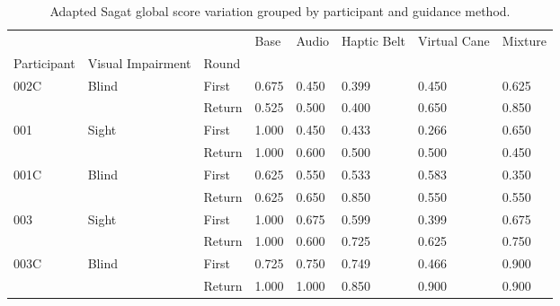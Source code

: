 
\begin{table}[!htb]
\centering
\caption{Adapted Sagat global score variation grouped by participant and guidance method.}
\label{tab:sagat}
\begin{tabular}{llllllll}
\toprule
     &       &        &  Base & Audio & Haptic Belt & Virtual Cane & Mixture \\
Participant & Visual Impairment & Round &       &       &             &              &         \\
\midrule
002C & Blind & First & 0.675 & 0.450 &       0.399 &        0.450 &   0.625 \\
     &       & Return & 0.525 & 0.500 &       0.400 &        0.650 &   0.850 \\
001 & Sight & First & 1.000 & 0.450 &       0.433 &        0.266 &   0.650 \\
     &       & Return & 1.000 & 0.600 &       0.500 &        0.500 &   0.450 \\
001C & Blind & First & 0.625 & 0.550 &       0.533 &        0.583 &   0.350 \\
     &       & Return & 0.625 & 0.650 &       0.850 &        0.550 &   0.550 \\
003 & Sight & First & 1.000 & 0.675 &       0.599 &        0.399 &   0.675 \\
     &       & Return & 1.000 & 0.600 &       0.725 &        0.625 &   0.750 \\
003C & Blind & First & 0.725 & 0.750 &       0.749 &        0.466 &   0.900 \\
     &       & Return & 1.000 & 1.000 &       0.850 &        0.900 &   0.900 \\
\bottomrule
\end{tabular}
\end{table}


